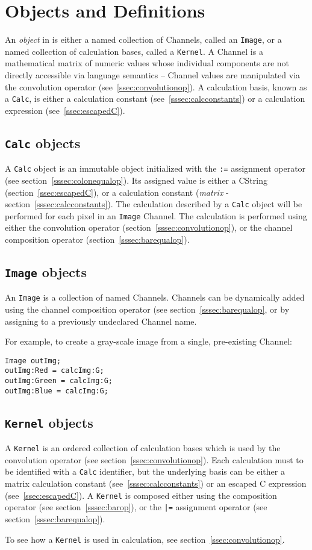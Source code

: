 \section{Objects and Definitions}
\label{sec:objdef}
An \emph{object} in \sys{} is either a named collection of Channels, called an
\texttt{Image}, or a named collection of calculation bases, called a
\texttt{Kernel}. A Channel is a mathematical matrix of numeric values
whose individual components are not directly accessible via \sys{} language
semantics -- Channel values are manipulated via the convolution
operator (see~\ref{ssec:convolutionop}). A calculation basis, known as a
\texttt{Calc}, is either a calculation constant
(see~\ref{sssec:calcconstants}) or a calculation expression (see~\ref{ssec:escapedC}).

\subsection{\texttt{Calc} objects}
\label{ssec:calc}
A  \texttt{Calc} object is an immutable object initialized with the \texttt{:=} assignment operator
(see section~\ref{sssec:colonequalop}). Its assigned value is either a CString (section~\ref{ssec:escapedC}),
or a calculation constant (\emph{matrix} - section~\ref{sssec:calcconstants}). The calculation
described by a \texttt{Calc} object will be performed for each pixel in an \texttt{Image} Channel.
The calculation is performed using either the convolution operator (section~\ref{sssec:convolutionop}),
or the channel composition operator (section~\ref{sssec:barequalop}).

\subsection{\texttt{Image} objects}
\label{ssec:images}
An \texttt{Image} is a collection of named Channels. Channels can
be dynamically added  using the channel composition
operator (see section~\ref{sssec:barequalop}, or by assigning to a previously
undeclared Channel name. 

For example, to create a gray-scale image from a single, pre-existing
Channel:
\begin{lstlisting}[language=CLAM,escapechar=\%]
Image outImg;
outImg:Red = calcImg:G;
outImg:Green = calcImg:G;
outImg:Blue = calcImg:G;
\end{lstlisting}

\subsection{\texttt{Kernel} objects}
\label{ssec:kernels}
A \texttt{Kernel} is an ordered collection of calculation bases which is used by the convolution
operator (see section~\ref{ssec:convolutionop}). Each calculation must to be identified with a \texttt{Calc}
identifier, but the underlying basis can be either
a matrix calculation constant (see~\ref{sssec:calcconstants}) or an escaped C expression
(see~\ref{ssec:escapedC}). A \texttt{Kernel} is composed either using the composition
operator (see section~\ref{sssec:barop}), or the \texttt{|=} assignment operator (see section~\ref{sssec:barequalop}).

To see how a \texttt{Kernel} is used in calculation, see section~\ref{ssec:convolutionop}.
